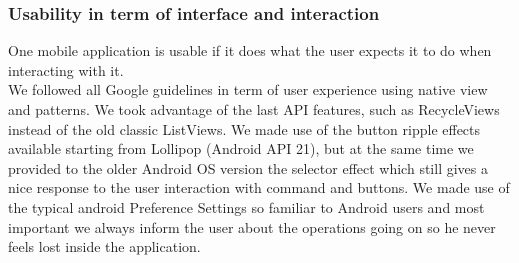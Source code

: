 \subsubsection{ Usability in term of interface and interaction}
One mobile application is usable if it does what the user expects it to do when interacting with it.\\
We followed all Google guidelines in term of user experience using native view and patterns. We took advantage of the last API features, such as RecycleViews instead of the old classic ListViews. We made use of the button ripple effects available starting from Lollipop (Android API 21), but at the same time we provided to the older Android OS version the selector effect which still gives a nice response to the user interaction with command and buttons. We made use of the typical android Preference Settings so familiar to Android users and most important we always inform the user about the operations going on so he never feels lost inside the application.
